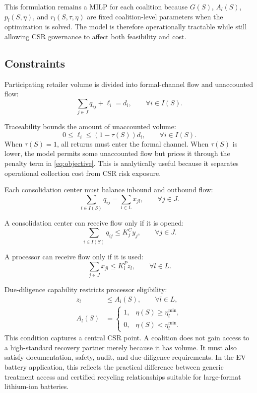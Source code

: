 This formulation remains a MILP for each coalition because $G(S)$, $A_l(S)$, $p_l(S,\eta)$, and $r_l(S,\tau,\eta)$ are fixed coalition-level parameters when the optimization is solved. The model is therefore operationally tractable while still allowing CSR governance to affect both feasibility and cost.

\subsection{Constraints}

Participating retailer volume is divided into formal-channel flow and unaccounted flow:
\begin{equation}
\label{eq:con_retailer}
\sum_{j\in J} q_{ij}+\ell_i=d_i,
\qquad \forall i\in I(S).
\end{equation}

Traceability bounds the amount of unaccounted volume:
\begin{equation}
\label{eq:con_leakage}
0\leq \ell_i\leq \left(1-\tau(S)\right)d_i,
\qquad \forall i\in I(S).
\end{equation}
When $\tau(S)=1$, all returns must enter the formal channel. When $\tau(S)$ is lower, the model permits some unaccounted flow but prices it through the penalty term in \eqref{eq:objective}. This is analytically useful because it separates operational collection cost from CSR risk exposure.

Each consolidation center must balance inbound and outbound flow:
\begin{equation}
\label{eq:con_consolidation}
\sum_{i\in I(S)} q_{ij}=\sum_{l\in L}x_{jl},
\qquad \forall j\in J.
\end{equation}

A consolidation center can receive flow only if it is opened:
\begin{equation}
\label{eq:con_cap_c}
\sum_{i\in I(S)}q_{ij}\leq K_j^C y_j,
\qquad \forall j\in J.
\end{equation}

A processor can receive flow only if it is used:
\begin{equation}
\label{eq:con_cap_p}
\sum_{j\in J}x_{jl}\leq K_l^P z_l,
\qquad \forall l\in L.
\end{equation}

Due-diligence capability restricts processor eligibility:
\begin{align}
\label{eq:con_processor_access}
z_l&\leq A_l(S),
\qquad \forall l\in L,\\
\label{eq:con_processor_eligibility}
A_l(S)&=
\begin{cases}
1, & \eta(S)\geq \eta_l^{\min},\\
0, & \eta(S)<\eta_l^{\min}.
\end{cases}
\end{align}
This condition captures a central CSR point. A coalition does not gain access to a high-standard recovery partner merely because it has volume. It must also satisfy documentation, safety, audit, and due-diligence requirements. In the EV battery application, this reflects the practical difference between generic treatment access and certified recycling relationships suitable for large-format lithium-ion batteries.

